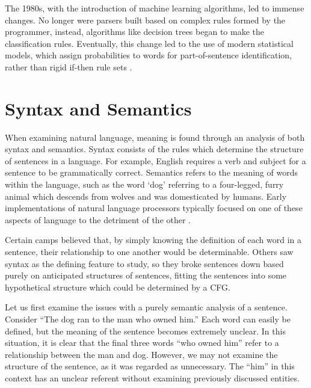 The 1980s, with the introduction of machine learning algorithms, led to immense changes. No longer were parsers built based on complex rules formed by the programmer, instead, algorithms like decision trees began to make the classification rules. Eventually, this change led to the use of modern statistical models, which assign probabilities to words for part-of-sentence identification, rather than rigid if-then rule sets \cite{1980}.

\section{Syntax and Semantics}

When examining natural language, meaning is found through an analysis of both syntax and semantics. Syntax consists of the rules which determine the structure of sentences in a language. For example, English requires a verb and subject for a sentence to be grammatically correct. Semantics refers to the meaning of words within the language, such as the word `dog' referring to a four-legged, furry animal which descends from wolves and was domesticated by humans. Early implementations of natural language processors typically focused on one of these aspects of language to the detriment of the other \cite{}.

Certain camps believed that, by simply knowing the definition of each word in a sentence, their relationship to one another would be determinable. Others saw syntax as the defining feature to study, so they broke sentences down based purely on anticipated structures of sentences, fitting the sentences into some hypothetical structure which could be determined by a CFG.

Let us first examine the issues with a purely semantic analysis of a sentence. Consider ``The dog ran to the man who owned him.'' Each word can easily be defined, but the meaning of the sentence becomes extremely unclear. In this situation, it is clear that the final three words ``who owned him'' refer to a relationship between the man and dog. However, we may not examine the structure of the sentence, as it was regarded as unnecessary. The ``him'' in this context has an unclear referent without examining previously discussed entities.

